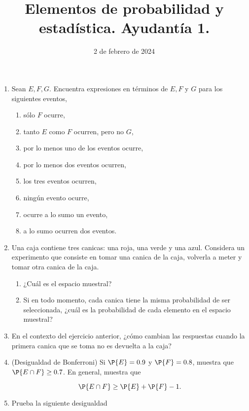 \documentclass{article}
\title{Elementos de probabilidad y estadística. Ayudantía 1.}
\date{2 de febrero de 2024}
\begin{document}
\maketitle


\begin{enumerate}
    \item Sean $E, F, G$. Encuentra expresiones en términos de $E,F$ y $G$ 
    para los siguientes eventos,
    \begin{enumerate}
        \item sólo $F$ ocurre,
        \item tanto $E$ como $F$ ocurren, pero no $G$,
        \item por lo menos uno de los eventos ocurre,
        \item por lo menos dos eventos ocurren,
        \item los tres eventos ocurren,
        \item ningún evento ocurre,
        \item ocurre a lo sumo un evento,
        \item a lo sumo ocurren dos eventos.
    \end{enumerate}

    \item Una caja contiene tres canicas: una roja, una verde y una azul. Considera un
    experimento que consiste en tomar una canica de la caja, volverla a meter y tomar 
    otra canica de la caja. 
    
    \begin{enumerate}
        \item ¿Cuál es el espacio muestral? 
        \item Si en todo momento, cada canica tiene la misma probabilidad de ser 
        seleccionada, ¿cuál es la probabilidad de cada elemento en el espacio muestral?
    \end{enumerate}

    \item En el contexto del ejercicio anterior, ¿cómo cambian las respuestas cuando
    la primera canica que se toma no es devuelta a la caja?

    \item (Desigualdad de Bonferroni) Si $\P{E}=0.9$ y $\P{F}=0.8$, muestra que $\P{E\cap F}\ge 0.7$.
    En general, muestra que 
            
            \[ \P{E\cap F} \ge \P{E} + \P{F} - 1. \] 

    
    \item Prueba la siguiente desigualdad
    

\end{enumerate}
\end{document}
